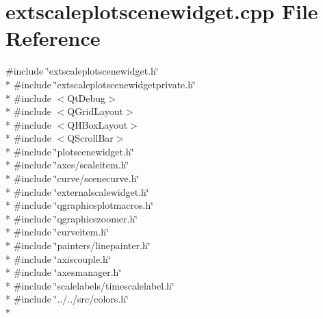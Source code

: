 \section{extscaleplotscenewidget.\+cpp File Reference}
\label{extscaleplotscenewidget_2extscaleplotscenewidget_8cpp}
{\ttfamily \#include \char`\"{}extscaleplotscenewidget.\+h\char`\"{}}\\*
{\ttfamily \#include \char`\"{}extscaleplotscenewidgetprivate.\+h\char`\"{}}\\*
{\ttfamily \#include $<$Qt\+Debug$>$}\\*
{\ttfamily \#include $<$Q\+Grid\+Layout$>$}\\*
{\ttfamily \#include $<$Q\+H\+Box\+Layout$>$}\\*
{\ttfamily \#include $<$Q\+Scroll\+Bar$>$}\\*
{\ttfamily \#include \char`\"{}plotscenewidget.\+h\char`\"{}}\\*
{\ttfamily \#include \char`\"{}axes/scaleitem.\+h\char`\"{}}\\*
{\ttfamily \#include \char`\"{}curve/scenecurve.\+h\char`\"{}}\\*
{\ttfamily \#include \char`\"{}externalscalewidget.\+h\char`\"{}}\\*
{\ttfamily \#include \char`\"{}qgraphicsplotmacros.\+h\char`\"{}}\\*
{\ttfamily \#include \char`\"{}qgraphicszoomer.\+h\char`\"{}}\\*
{\ttfamily \#include \char`\"{}curveitem.\+h\char`\"{}}\\*
{\ttfamily \#include \char`\"{}painters/linepainter.\+h\char`\"{}}\\*
{\ttfamily \#include \char`\"{}axiscouple.\+h\char`\"{}}\\*
{\ttfamily \#include \char`\"{}axesmanager.\+h\char`\"{}}\\*
{\ttfamily \#include \char`\"{}scalelabels/timescalelabel.\+h\char`\"{}}\\*
{\ttfamily \#include \char`\"{}../../src/colors.\+h\char`\"{}}\\*
